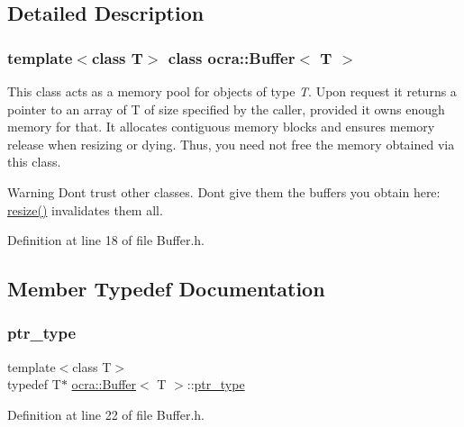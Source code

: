 \subsection{Detailed Description}
\subsubsection*{template$<$class T$>$\newline
class ocra\+::\+Buffer$<$ T $>$}

This class acts as a memory pool for objects of type {\itshape T}. Upon request it returns a pointer to an array of T of size specified by the caller, provided it owns enough memory for that. It allocates contiguous memory blocks and ensures memory release when resizing or dying. Thus, you need not free the memory obtained via this class.

\begin{DoxyWarning}{Warning}
Don\textquotesingle{}t trust other classes. Don\textquotesingle{}t give them the buffers you obtain here\+: \hyperlink{classocra_1_1Buffer_a171d3ec7b50688fd529c8ae3dff7b6d1}{resize()} invalidates them all. 
\end{DoxyWarning}


Definition at line 18 of file Buffer.\+h.



\subsection{Member Typedef Documentation}
\hypertarget{classocra_1_1Buffer_a26bf1dc373e2144eddd0dd8be4b37f84}{}\label{classocra_1_1Buffer_a26bf1dc373e2144eddd0dd8be4b37f84} 
\subsubsection{\texorpdfstring{ptr\+\_\+type}{ptr\_type}}
{\footnotesize\ttfamily template$<$class T$>$ \\
typedef T$\ast$ \hyperlink{classocra_1_1Buffer}{ocra\+::\+Buffer}$<$ T $>$\+::\hyperlink{classocra_1_1Buffer_a26bf1dc373e2144eddd0dd8be4b37f84}{ptr\+\_\+type}}



Definition at line 22 of file Buffer.\+h.

\hypertarget{classocra_1_1Buffer_ad03bef3764c265411b5b7726d94d8786}{}\label{classocra_1_1Buffer_ad03bef3764c265411b5b7726d94d8786} 
